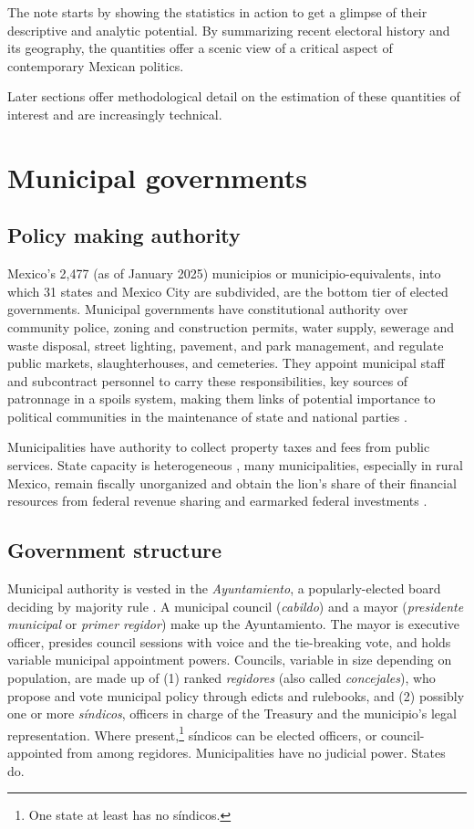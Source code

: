 \documentclass[letter,12pt]{article}
\begin{document}
The note starts by showing the statistics in action to get a glimpse of their descriptive and analytic potential. By summarizing recent electoral history and its geography, the quantities offer a scenic view of a critical aspect of contemporary Mexican politics. 

Later sections offer methodological detail on the estimation of these quantities of interest and are increasingly technical. 

\section{Municipal governments}
\subsection{Policy making authority}
Mexico's 2,477 (as of January 2025) municipios or municipio-equivalents, into which 31 states and Mexico City are subdivided, are the bottom tier of elected governments. Municipal governments have constitutional authority over community police, zoning and construction permits, water supply, sewerage and waste disposal, street lighting, pavement, and park management, and regulate public markets, slaughterhouses, and cemeteries. They appoint municipal staff and subcontract personnel to carry these responsibilities, key sources of patronnage in a spoils system, making them links of potential importance to political communities in the maintenance of state and national parties \citep{key.1964, sorauf.1959}. 

Municipalities have authority to collect property taxes and fees from public services. State capacity is heterogeneous \citep{garfias.state.cap.2018}, many municipalities, especially in rural Mexico, remain fiscally unorganized and obtain the lion's share of their financial resources from federal revenue sharing and earmarked federal investments \citep{diaz.cayeros.2006, figueroa-mansur-itam.2024}. 

\subsection{Government structure}
Municipal authority is vested in the \emph{Ayuntamiento}, a popularly-elected board deciding by majority rule \citep{robles-mtz.Municipio.2009}. A municipal council (\emph{cabildo}) and a mayor (\emph{presidente municipal} or \emph{primer regidor}) make up the Ayuntamiento. The mayor is executive officer, presides council sessions with voice and the tie-breaking vote, and holds variable municipal appointment powers. Councils, variable in size depending on population, are made up of (1) ranked \emph{regidores} (also called \emph{concejales}), who propose and vote municipal policy through edicts and rulebooks, and (2) possibly one or more \emph{síndicos}, officers in charge of the Treasury and the municipio's legal representation. Where present,\footnote{One state at least \citep[Sinaloa, see][]{rmz-millan.2000} has no síndicos.} síndicos can be elected officers, or council-appointed from among regidores. Municipalities have no judicial power. States do.
\end{document}
